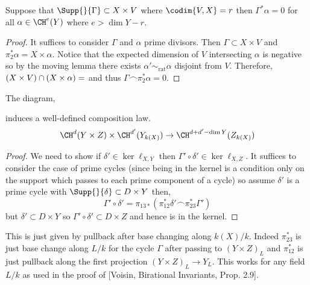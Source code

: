 \documentclass[12pt]{article}
\begin{document}
\begin{lemma}
Suppose that $\Supp{}{\Gamma} \subset X \times V$ where $\codim{V,X} = r$ then $\Gamma^* \alpha = 0$ for all $\alpha \in \CH^{e}(Y)$ where $e > \dim{Y} - r$. 
\end{lemma}

\begin{proof}
It suffices to consider $\Gamma$ and $\alpha$ prime divisors. Then $\Gamma \subset X \times V$ and $\pi_2^* \alpha = X \times \alpha$. Notice that the expected dimension of $V$ intersecting $\alpha$ is negative so by the moving lemma there exists $\alpha' \sim_{\text{rat}} \alpha$ disjoint from $V$. Therefore, $(X \times V) \cap (X \times \alpha) = \empty$ and thus $\Gamma \frown \pi_2^* \alpha = 0$.
\end{proof}


\begin{prop}
The diagram,
\begin{center}
\end{center}
induces a well-defined composition law. 
\[ \CH^{d}(Y \times Z) \times \CH^{d'}(Y_{k(X)}) \to \CH^{d+d'-\dim{Y}}(Z_{k(X)}) \]
\end{prop}

\begin{proof}
We need to show if $\delta' \in \ker{\ell_{X,Y}}$ then $\Gamma' \circ \delta' \in \ker{\ell_{X,Z}}$. It suffices to consider the case of prime cycles (since being in the kernel is a condition only on the support which passes to each prime component of a cycle) so assume $\delta'$ is a prime cycle with $\Supp{}{\delta} \subset D \times Y$ then,
\[ \Gamma' \circ \delta' = \pi_{13*}(\pi_{12}^* \delta' \frown \pi_{23}^* \Gamma') \]
but $\delta' \subset D \times Y$ so $\Gamma' \circ \delta' \subset D \times Z$ and hence is in the kernel. 
\end{proof}

\begin{rmk}
This is just given by pullback after base changing along $k(X) / k$. Indeed $\pi_{23}^*$ is just base change along $L / k$ for the cycle $\Gamma$ after passing to $(Y \times Z)_{L}$ and $\pi_{12}^*$ is just pullback along the first projection $(Y \times Z)_{L} \to Y_{L}$. This works for any field $L/k$ as used in the proof of [Voisin, Birational Invariants, Prop. 2.9]. 
\end{rmk}
\end{document}
